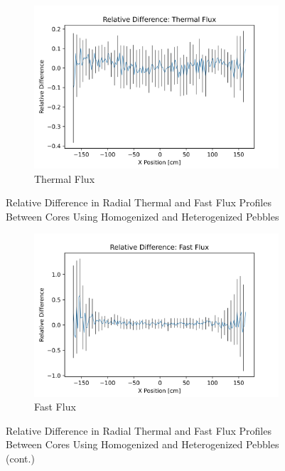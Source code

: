 \begin{figure}[H]
\centering

\begin{subfigure}{0.9\textwidth}
  \includegraphics[width=0.9\linewidth]{figures/reldiff_therm_flux.png}
  \caption{Thermal Flux}
  \label{fig:diff-therm}
\end{subfigure}%

\caption{Relative Difference in Radial Thermal and Fast Flux Profiles Between Cores Using Homogenized and Heterogenized Pebbles}
\end{figure}

\begin{figure}[H]\ContinuedFloat
\centering

\begin{subfigure}{0.9\textwidth}
  \includegraphics[width=0.9\linewidth]{figures/reldiff_fast_flux.png}
  \caption{Fast Flux}
  \label{fig:diff-fast}
\end{subfigure}

%
\caption{Relative Difference in Radial Thermal and Fast Flux Profiles Between Cores Using Homogenized and Heterogenized Pebbles (cont.)}
\label{fig:diff-flux}
\end{figure}